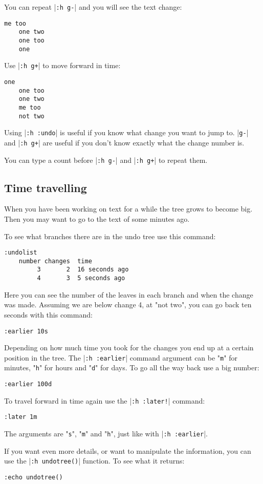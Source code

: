 You can repeat |\texttt{:h g-}| and you will see the text change:

\begin{Verbatim}[samepage=true]
    me too 
    one two 
    one too 
    one 
\end{Verbatim}

Use |\texttt{:h g+}| to move forward in time:

\begin{Verbatim}[samepage=true]
    one 
    one too 
    one two 
    me too 
    not two 
\end{Verbatim}

Using |\texttt{:h :undo}| is useful if you know what change you want to jump to.
|\texttt{g-}| and |\texttt{:h g+}| are useful if you don't know exactly what the change number is.

You can type a count before |\texttt{:h g-}| and |\texttt{:h g+}| to repeat them.
\subsection{Time travelling}
When you have been working on text for a while the tree grows to become big.
Then you may want to go to the text of some minutes ago.

To see what branches there are in the undo tree use this command:

\begin{Verbatim}[samepage=true]
 :undolist
    number changes  time 
         3       2  16 seconds ago
         4       3  5 seconds ago
\end{Verbatim}

Here you can see the number of the leaves in each branch and when the change was made.
Assuming we are below change 4, at "not two", you can go back ten seconds with this command:

\begin{Verbatim}[samepage=true]
 :earlier 10s
\end{Verbatim}

Depending on how much time you took for the changes you end up at a certain position in the tree.
The |\texttt{:h :earlier}| command argument can be "\texttt{m}" for minutes, "\texttt{h}" for hours and "\texttt{d}" for days.
To go all the way back use a big number:

\begin{Verbatim}[samepage=true]
 :earlier 100d
\end{Verbatim}

To travel forward in time again use the |\texttt{:h :later!}| command:

\begin{Verbatim}[samepage=true]
 :later 1m
\end{Verbatim}

The arguments are "\texttt{s}", "\texttt{m}" and "\texttt{h}", just like with |\texttt{:h :earlier}|.

If you want even more details, or want to manipulate the information, you can use the |\texttt{:h undotree()}| function.
To see what it returns:

\begin{Verbatim}[samepage=true]
 :echo undotree()
\end{Verbatim}
\clearpage
